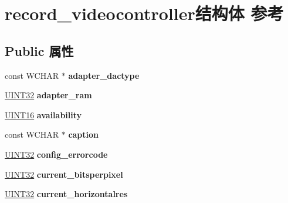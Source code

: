 \hypertarget{structrecord__videocontroller}{}\section{record\+\_\+videocontroller结构体 参考}
\label{structrecord__videocontroller}
\subsection*{Public 属性}
\begin{DoxyCompactItemize}
\item 
\mbox{\label{structrecord__videocontroller_a1a3a9306de378f3f0d9c9000b1b32719}} 
const W\+C\+H\+AR $\ast$ {\bfseries adapter\+\_\+dactype}
\item 
\mbox{\label{structrecord__videocontroller_a95b09651578286ec6fe50a978c0d116e}} 
\hyperlink{_processor_bind_8h_ae1e6edbbc26d6fbc71a90190d0266018}{U\+I\+N\+T32} {\bfseries adapter\+\_\+ram}
\item 
\mbox{\label{structrecord__videocontroller_a5e1bc7db188f46d53d679c587f6f7ec2}} 
\hyperlink{_processor_bind_8h_a09f1a1fb2293e33483cc8d44aefb1eb1}{U\+I\+N\+T16} {\bfseries availability}
\item 
\mbox{\label{structrecord__videocontroller_a196a27d41d6dde5d34cd7fdbd1a67ad5}} 
const W\+C\+H\+AR $\ast$ {\bfseries caption}
\item 
\mbox{\label{structrecord__videocontroller_ad945e0350c92863e3c7ffbaa672f4255}} 
\hyperlink{_processor_bind_8h_ae1e6edbbc26d6fbc71a90190d0266018}{U\+I\+N\+T32} {\bfseries config\+\_\+errorcode}
\item 
\mbox{\label{structrecord__videocontroller_a025de7f0553e5e3ac96c7bc4b21bb8ad}} 
\hyperlink{_processor_bind_8h_ae1e6edbbc26d6fbc71a90190d0266018}{U\+I\+N\+T32} {\bfseries current\+\_\+bitsperpixel}
\item 
\mbox{\label{structrecord__videocontroller_a6ac28af3170d94b41465de7b556d7582}} 
\hyperlink{_processor_bind_8h_ae1e6edbbc26d6fbc71a90190d0266018}{U\+I\+N\+T32} {\bfseries current\+\_\+horizontalres}

\end{DoxyCompactItemize}
